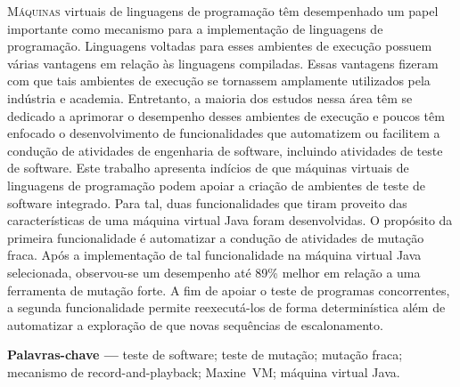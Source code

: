 
\lettrine{M}{áquinas} virtuais de linguagens de programação têm desempenhado um papel importante como 
mecanismo para a implementação de linguagens de programação. 
Linguagens voltadas para esses ambientes de execução possuem  
várias vantagens em relação às linguagens compiladas. 
Essas vantagens fizeram com que tais ambientes de execução se tornassem amplamente utilizados pela 
indústria e academia. 
Entretanto, 
a maioria dos 
estudos nessa área têm se dedicado a aprimorar o desempenho desses ambientes de execução e poucos têm enfocado o desenvolvimento de funcionalidades 
que automatizem ou facilitem a 
condução de atividades de engenharia de software, 
incluindo atividades de teste de software. 
Este trabalho apresenta indícios de que   
máquinas virtuais de linguagens de programação podem apoiar a criação de ambientes de teste de software integrado. 
Para tal, 
duas funcionalidades que tiram proveito das características de uma máquina virtual Java 
foram desenvolvidas. 
O propósito da primeira funcionalidade é automatizar a condução de atividades de mutação fraca. 
Após a implementação de tal funcionalidade na máquina virtual Java selecionada, 
observou-se um desempenho até 89\% melhor em relação a uma ferramenta de mutação forte. 
A fim de apoiar o teste de programas concorrentes, 
a segunda funcionalidade permite reexecutá-los de forma determinística 
além de automatizar a exploração de que novas sequências de escalonamento.
 
\smallskip
\noindent \textbf{Palavras-chave ---} teste de software; teste de mutação; mutação fraca; mecanismo de record\--and\--playback; Maxine~VM; máquina virtual Java.
